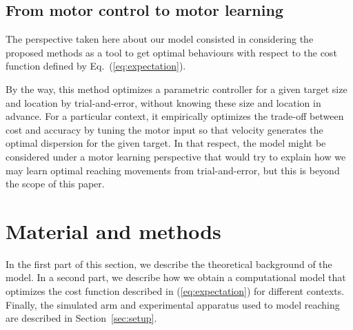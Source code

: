 \documentclass[10pt]{article}
\begin{document}
 


\subsection{From motor control to motor learning}

The perspective taken here about our model consisted in considering the proposed
methods as a tool to get optimal behaviours with respect to the cost function
defined by Eq.~(\ref{eq:expectation}).

By the way, this method optimizes a parametric controller for a given target size and location by trial-and-error, without knowing these size and location in advance. For a particular context, it empirically optimizes the trade-off between cost and accuracy by tuning the motor input so that velocity generates the optimal dispersion for the given target.
In that respect, the model might be considered under a motor learning perspective
that would try to explain how we may learn optimal reaching movements from trial-and-error,
but this is beyond the scope of this paper.

\section{Material and methods}
\label{sec:methods}

In the first part of this section, we describe the theoretical background of the model.
In a second part, we describe how we obtain a computational model that optimizes
the cost function described in (\ref{eq:expectation}) for different contexts.
Finally, the simulated arm and experimental apparatus used to model reaching
are described in Section~\ref{sec:setup}.
\end{document}
